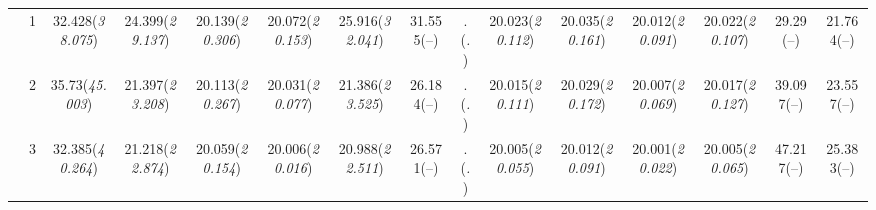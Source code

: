 \documentclass{article}
\begin{document}
\begin{table}[tbp]
{\begin{tabularx}{\textwidth}{lCCCCCCCCCCCCCC}
&1&32.428\newline (\emph{38.075})&24.399\newline (\emph{29.137})&20.139\newline (\emph{20.306})&20.072\newline (\emph{20.153})&25.916\newline (\emph{32.041})&31.555\newline (--)&.\newline (\emph{.})&20.023\newline (\emph{20.112})&20.035\newline (\emph{20.161})&20.012\newline (\emph{20.091})&20.022\newline (\emph{20.107})&29.29\newline (--)&21.764\newline (--) \tabularnewline
&2&35.73\newline (\emph{45.003})&21.397\newline (\emph{23.208})&20.113\newline (\emph{20.267})&20.031\newline (\emph{20.077})&21.386\newline (\emph{23.525})&26.184\newline (--)&.\newline (\emph{.})&20.015\newline (\emph{20.111})&20.029\newline (\emph{20.172})&20.007\newline (\emph{20.069})&20.017\newline (\emph{20.127})&39.097\newline (--)&23.557\newline (--) \tabularnewline
&3&32.385\newline (\emph{40.264})&21.218\newline (\emph{22.874})&20.059\newline (\emph{20.154})&20.006\newline (\emph{20.016})&20.988\newline (\emph{22.511})&26.571\newline (--)&.\newline (\emph{.})&20.005\newline (\emph{20.055})&20.012\newline (\emph{20.091})&20.001\newline (\emph{20.022})&20.005\newline (\emph{20.065})&47.217\newline (--)&25.383\newline (--) \tabularnewline

\end{tabularx}}
\end{table}
\end{document}
